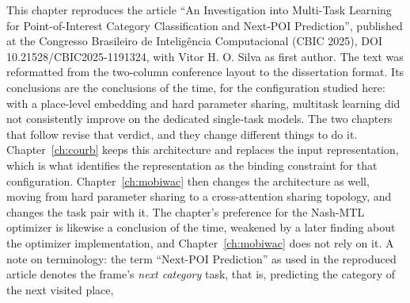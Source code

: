 \begin{chapterpreface}
This chapter reproduces the article ``An Investigation into Multi-Task Learning for
Point-of-Interest Category Classification and Next-POI Prediction'', published at the
Congresso Brasileiro de Intelig\^encia Computacional (CBIC 2025), DOI
10.21528/CBIC2025-1191324, with Vitor H. O. Silva as first author. The text was
reformatted from the two-column conference layout to the dissertation format. Its
conclusions are the conclusions of the time, for the configuration studied here: with a
place-level embedding and hard parameter sharing, multitask learning did not
consistently improve on the dedicated single-task models. The two chapters that follow
revise that verdict, and they change different things to do it.
Chapter~\ref{ch:courb} keeps this architecture and replaces the input representation,
which is what identifies the representation as the binding constraint for that configuration.
Chapter~\ref{ch:mobiwac} then changes the architecture as well, moving from hard
parameter sharing to a cross-attention sharing topology, and changes the task pair with
it. The chapter's preference for the Nash-MTL optimizer is likewise
a conclusion of the time, weakened by a later finding about the optimizer
implementation, and Chapter~\ref{ch:mobiwac} does not rely on it. A note on terminology:
the term ``Next-POI Prediction'' as used in the reproduced article denotes the frame's
\emph{next category} task, that is, predicting the category of the next visited place,

\end{chapterpreface}
